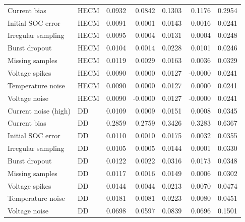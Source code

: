 \documentclass[review]{elsarticle}
\begin{document}
\begin{longtable}{llrrrrr}
Current bias & HECM & 0.0932 & 0.0842 & 0.1303 & 0.1176 & 0.2954 \\
Initial SOC error & HECM & 0.0091 & 0.0001 & 0.0143 & 0.0016 & 0.0241 \\
Irregular sampling & HECM & 0.0095 & 0.0004 & 0.0131 & 0.0004 & 0.0248 \\
Burst dropout & HECM & 0.0104 & 0.0014 & 0.0228 & 0.0101 & 0.0246 \\
Missing samples & HECM & 0.0119 & 0.0029 & 0.0163 & 0.0036 & 0.0329 \\
Voltage spikes & HECM & 0.0090 & 0.0000 & 0.0127 & -0.0000 & 0.0241 \\
Temperature noise & HECM & 0.0090 & 0.0000 & 0.0127 & 0.0000 & 0.0241 \\
Voltage noise & HECM & 0.0090 & -0.0000 & 0.0127 & -0.0000 & 0.0241 \\
Current noise (high) & DD & 0.0109 & 0.0009 & 0.0151 & 0.0008 & 0.0345 \\
Current bias & DD & 0.2859 & 0.2759 & 0.3426 & 0.3283 & 0.6367 \\
Initial SOC error & DD & 0.0110 & 0.0010 & 0.0175 & 0.0032 & 0.0355 \\
Irregular sampling & DD & 0.0105 & 0.0005 & 0.0144 & 0.0001 & 0.0330 \\
Burst dropout & DD & 0.0122 & 0.0022 & 0.0316 & 0.0173 & 0.0348 \\
Missing samples & DD & 0.0117 & 0.0016 & 0.0149 & 0.0006 & 0.0302 \\
Voltage spikes & DD & 0.0144 & 0.0044 & 0.0213 & 0.0070 & 0.0474 \\
Temperature noise & DD & 0.0181 & 0.0081 & 0.0223 & 0.0080 & 0.0451 \\
Voltage noise & DD & 0.0698 & 0.0597 & 0.0839 & 0.0696 & 0.1501 \\
\bottomrule
\end{longtable}
\end{document}
